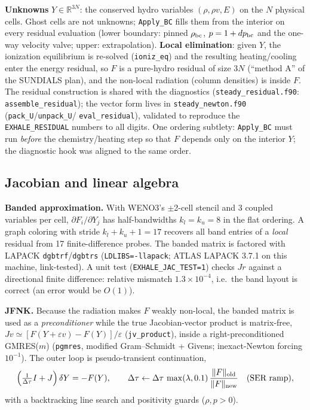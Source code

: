 \documentclass[english,a4paper]{my_memo}
\newcommand{\code}[1]{\texttt{#1}}
\begin{document}
\textbf{Unknowns} $Y\in\mathbb{R}^{3N}$: the conserved hydro variables
$(\rho,\rho v,E)$ on the $N$ physical cells. Ghost cells are not unknowns;
\code{Apply\_BC} fills them from the interior on every residual evaluation
(lower boundary: pinned $\rho_{\rm bc}$, $p=1+dp_{\rm bc}$ and the one-way
velocity valve; upper: extrapolation). \textbf{Local elimination}: given
$Y$, the ionization equilibrium is re-solved (\code{ioniz\_eq}) and the
resulting heating/cooling enter the energy residual, so $F$ is a
pure-hydro residual of size $3N$ (``method A'' of the SUNDIALS plan), and
the non-local radiation (column densities) is inside $F$. The residual
construction is shared with the diagnostics
(\code{steady\_residual.f90}: \code{assemble\_residual}); the vector form
lives in \code{steady\_newton.f90} (\code{pack\_U}/\code{unpack\_U}/
\code{eval\_residual}), validated to reproduce the \code{EXHALE\_RESIDUAL}
numbers to all digits. One ordering subtlety: \code{Apply\_BC} must run
\emph{before} the chemistry/heating step so that $F$ depends only on the
interior $Y$; the diagnostic hook was aligned to the same order.

\subsection{Jacobian and linear algebra}

\textbf{Banded approximation.} With WENO3's $\pm$2-cell stencil and 3
coupled variables per cell, $\partial F_i/\partial Y_j$ has half-bandwidths
$k_l=k_u=8$ in the flat ordering. A graph coloring with stride
$k_l{+}k_u{+}1=17$ recovers all band entries of a \emph{local} residual
from 17 finite-difference probes. The banded matrix is factored with
LAPACK \code{dgbtrf}/\code{dgbtrs} (\code{LDLIBS=-llapack}; ATLAS LAPACK
3.7.1 on this machine, link-tested). A unit test
(\code{EXHALE\_JAC\_TEST=1}) checks $J r$ against a directional finite
difference: relative mismatch $1.3\times10^{-4}$, i.e.\ the band layout is
correct (an error would be $O(1)$).

\textbf{JFNK.} Because the radiation makes $F$ weakly non-local, the
banded matrix is used as a \emph{preconditioner} while the true
Jacobian-vector product is matrix-free,
$Jv \simeq [F(Y+\varepsilon v)-F(Y)]/\varepsilon$
(\code{jv\_product}), inside a right-preconditioned GMRES($m$)
(\code{pgmres}, modified Gram--Schmidt + Givens; inexact-Newton forcing
$10^{-1}$). The outer loop is pseudo-transient continuation,
\begin{equation}
\Big(\tfrac{1}{\Delta\tau} I + J\Big)\,\delta Y = -F(Y),
\qquad \Delta\tau \leftarrow \Delta\tau\,
\max(\lambda,0.1)\,\frac{\|F\|_{\rm old}}{\|F\|_{\rm new}}
\quad(\text{SER ramp}),
\end{equation}
with a backtracking line search and positivity guards ($\rho,p>0$).
\end{document}
